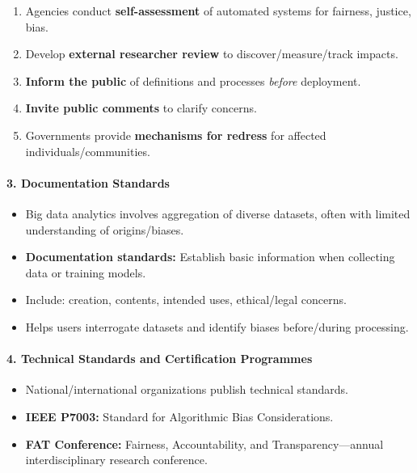 \begin{keybox}
\begin{enumerate}
  \item Agencies conduct \textbf{self-assessment} of automated systems for fairness, justice, bias.
  \item Develop \textbf{external researcher review} to discover/measure/track impacts.
  \item \textbf{Inform the public} of definitions and processes \textit{before} deployment.
  \item \textbf{Invite public comments} to clarify concerns.
  \item Governments provide \textbf{mechanisms for redress} for affected individuals/communities.
\end{enumerate}
\end{keybox}

\separator

\paragraph*{3. Documentation Standards}

\begin{itemize}
  \item Big data analytics involves aggregation of diverse datasets, often with limited understanding of origins/biases.
  \item \textbf{Documentation standards:} Establish basic information when collecting data or training models.
  \item Include: creation, contents, intended uses, ethical/legal concerns.
  \item Helps users interrogate datasets and identify biases before/during processing.
\end{itemize}

\separator

\paragraph*{4. Technical Standards and Certification Programmes}

\begin{itemize}
  \item National/international organizations publish technical standards.
  \item \textbf{IEEE P7003\texttrademark:} Standard for Algorithmic Bias Considerations.
  \item \textbf{FAT Conference:} Fairness, Accountability, and Transparency---annual interdisciplinary research conference.
\end{itemize}

